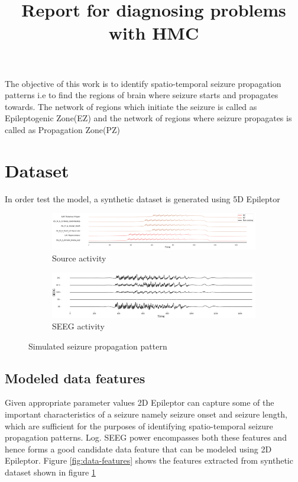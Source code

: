 \documentclass[12pt]{article}
\title{Report for diagnosing problems with HMC}
\begin{document}
\begin{titlepage}
  \maketitle
\end{titlepage}
The objective of this work is to identify spatio-temporal seizure propagation patterns i.e to find the regions of brain where seizure starts and propagates towards. The network of regions which initiate the seizure is called as Epileptogenic Zone(EZ) and the network of regions where seizure propagates is called as Propagation Zone(PZ)

\section*{Dataset}
In order test the model, a synthetic dataset is generated using 5D Epileptor
\begin{figure}[h!]
  \centering
  \begin{subfigure}{\linewidth}
    \includegraphics[width=\textwidth]{figures/source_activity_syn_data.png}
    \caption{Source activity}
  \end{subfigure}
  \begin{subfigure}{\linewidth}
    \includegraphics[width=\textwidth]{figures/seeg_syn_data.png}
    \caption{SEEG activity}
  \end{subfigure}
  \caption{Simulated seizure propagation pattern}
  \label{fig:syn-data}
\end{figure}
\subsection*{Modeled data features}
Given appropriate parameter values 2D Epileptor can capture some of the important characteristics of a seizure namely seizure onset and seizure length, which are sufficient for the purposes of identifying spatio-temporal seizure propagation patterns. Log. SEEG power encompasses both these features and hence forms a good candidate data feature that can be modeled using 2D Epileptor. Figure \ref{fig:data-features} shows the features extracted from synthetic dataset shown in figure \ref{fig:syn-data}
\end{document}
